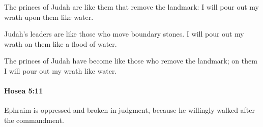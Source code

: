 			\begin{versebox}
					\item[BHS] 
					\item[LXX] 
					\item[ASV] The princes of Judah are like them that remove the landmark: I will pour out my wrath upon them like water.
					\item[NIV] Judah’s leaders are like those who move boundary stones. I will pour out my wrath on them like a flood of water.
					\item[NRSV] The princes of Judah have become like those who remove the landmark; on them I will pour out my wrath like water.
			\end{versebox}

		\paragraph{Hosea 5:11} %
			\label{HOSEA-5-11}

			Ephraim is oppressed and broken in judgment, because he willingly walked after the commandment.

